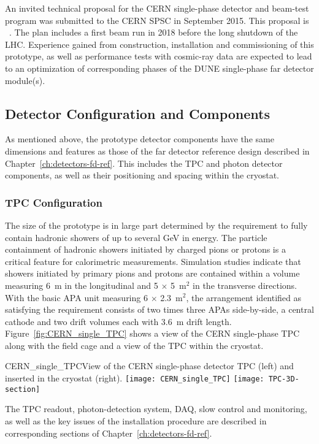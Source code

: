 An invited technical proposal for the CERN single-phase detector and
beam-test program
was submitted
to the CERN SPSC in September 2015. This proposal is \anxcernproto~\cite{cdr-annex-singleph-proto}. The plan includes a first beam run in
2018 before the long shutdown of the LHC. Experience gained from
construction, installation and commissioning of this prototype, as
well as performance tests with cosmic-ray data are expected to lead to
an optimization of corresponding phases of the DUNE single-phase far
detector module(s).

\subsection{Detector Configuration and Components}

As mentioned above, the prototype detector components have 
the same dimensions and features as those of the far detector reference design described in
Chapter~\ref{ch:detectors-fd-ref}. This includes the TPC and photon
detector components, as well as their positioning and spacing within
the cryostat.


\subsubsection{TPC Configuration}

The size of the prototype is in large part determined by the
requirement to fully contain hadronic showers of up to several GeV in
energy.  The particle containment of hadronic showers initiated by
charged pions or protons is a critical feature for calorimetric
measurements. Simulation studies indicate that showers initiated by
 primary pions and protons are contained within a volume
measuring 6~m in the longitudinal and 5 $\times$ 5~m$^2$ in the
transverse directions. With the basic APA unit measuring
6 $\times$ 2.3~m$^2$, the arrangement identified as satisfying the
requirement consists of two times three APAs side-by-side, a central
cathode and two drift volumes each with 3.6~m drift
length. Figure~\ref{fig:CERN_single_TPC} shows a view of the CERN
single-phase TPC along with the field cage and a view of the TPC
within the cryostat.
\begin{cdrfigure}{CERN_single_TPC}{View of the CERN single-phase detector TPC (left) and inserted in the cryostat (right). }
\texttt{[image: CERN\_single\_TPC]}
\texttt{[image: TPC-3D-section]}
\end{cdrfigure}
The TPC readout, photon-detection system, DAQ, slow control and
monitoring, as well as the key issues of the installation procedure
are described in corresponding sections of
Chapter~\ref{ch:detectors-fd-ref}.

